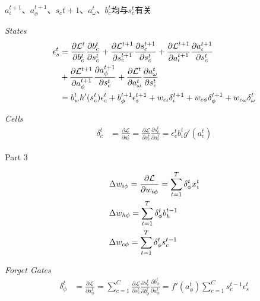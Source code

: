 \documentclass[UTF8]{article}
\begin{document}
        $a_\iota^{t+1}$、$a_\phi^{t+1}$、$s_c{t+1}$、$a_\omega^{t}$、$b_c^t$均与$s_c^t$有关
        
        \emph{States}
        \begin{align}
        \epsilon_s^t &=  \frac{\partial \mathcal{L}^{t}}{\partial b_c^t} \frac{\partial b_c^{t}}{\partial s_c^t} 
        + \frac{\partial \mathcal{L}^{t+1}}{\partial s_c^{t+1}} \frac{\partial s_c^{t+1}}{\partial s_c^t} 
        + \frac{\partial \mathcal{L}^{t+1}}{\partial a_\iota^{t+1}} \frac{\partial a_\iota^{t+1}}{\partial s_c^t} \notag  \\
        &+ \frac{\partial \mathcal{L}^{t+1}}{\partial a_\phi^{t+1}} \frac{\partial a_\phi^{t+1}}{\partial s_c^t}
        + \frac{\partial \mathcal{L}^{t}}{\partial a_\omega^{t}} \frac{\partial a_\omega^{t}}{\partial s_c^t}   \notag \\
        &=  b_w^t h'(s_c^t) \epsilon_c^t + b_\phi^{t+1} \epsilon_s^{t+1} + w_{c\iota} \delta_\iota^{t+1} + w_{c\phi} \delta_\phi^{t+1} + w_{c\omega} \delta_\omega^{t}
        \end{align}
        
        \emph{Cells}
        \begin{align}
        \delta_c^t &= \frac{\partial \mathcal{L}}{\partial a_c^t}
        = \frac{\partial \mathcal{L}}{\partial s_c^t} \frac{\partial s_c^t}{\partial a_c^t}
        = \epsilon_c^t b_\iota^t g'(a_c^t)
        \end{align}
        
        Part 3

        \begin{align}
        & \Delta w_{i\phi} = \frac{\partial \mathcal{L}}{\partial w_{i\phi}}
        = \sum_{t=1}^T \delta_\phi^t x_i^t \notag \\
        & \Delta w_{h\phi} = \sum_{t=1}^T \delta_\phi^t b_h^{t-1} \notag \\
        & \Delta w_{c\phi} = \sum_{t=1}^T \delta_\phi^t s_c^{t-1} \notag 
        \end{align}
        
        \emph{Forget Gates}
        \begin{align}
        \delta_\phi^t &= \frac{\partial \mathcal{L}}{\partial a_\phi^t}
        = \sum_{c=1}^C \frac{\partial \mathcal{L}}{\partial s_c^t} \frac{\partial s_c^t}{\partial b_\phi^t} \frac{\partial b_\phi^t}{\partial a_\phi^t}
        = f'(a_\phi^t) \sum_{c=1}^C s_c^{t-1} \epsilon_s^t
        \end{align}
        
\end{document}
